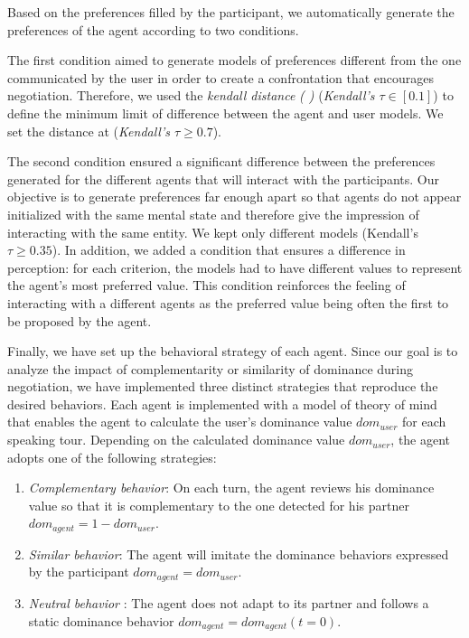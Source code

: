 \documentclass[10pt, a4paper]{article} %
\begin{document}
		Based on the preferences filled by the participant, we automatically generate the preferences of the agent  according to two conditions.
	
		The first condition aimed to generate models of preferences different from the one communicated by the user in order to create a confrontation that encourages negotiation. Therefore, we used the \textit{kendall distance} \emph{(\cite{bra2013Kendall} )} (\emph{Kendall's $ \tau \in[0.1]$}) to define the minimum limit of difference between the agent and user models. We set the distance at (\emph{Kendall's $ \tau \geq 0.7$}).
	
		The second condition ensured a significant difference between the preferences generated for the different agents that will interact with the participants. 
		Our objective is to generate preferences far enough apart so that agents do not appear initialized with the same mental state and therefore give the impression of interacting with the same entity. We kept only different models (Kendall's $ \tau \geq 0.35$). In addition, we added a condition that ensures a difference in perception: for each criterion, the models had to have different values to represent the agent's most preferred value. 
		This condition reinforces the feeling of interacting with a different agents as the preferred value being often the first to be proposed by the agent. 
		
		Finally, we have set up the behavioral strategy of each agent. Since our goal is to analyze the impact of complementarity or similarity of dominance during negotiation, we have implemented three distinct strategies that reproduce the desired behaviors. 
		Each agent is implemented with a model of theory of mind that enables the agent to calculate the user's dominance value $dom_{user}$ for each speaking tour. Depending on the calculated dominance value $dom_{user}$, the agent adopts one of the following strategies:
		
		\begin{enumerate}
		\item \textit{Complementary behavior}: On each turn, the agent reviews his dominance value so that it is complementary to the one detected for his partner $dom_{agent}=1-dom_{user}$.
		
		\item \textit{Similar behavior}: The agent will imitate the dominance behaviors expressed by the participant $dom_{agent} = dom_{user}$.
		
		\item \textit{Neutral behavior} : The agent does not adapt to its partner and follows a static dominance behavior $dom_{agent} = dom_{agent} (t=0)$.
		
		
	\end{enumerate}
	
\end{document}
